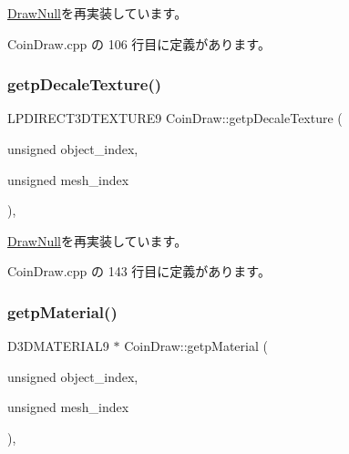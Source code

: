 \mbox{\hyperlink{class_draw_null_a7586cc78eed6bcaf2972ad7a6a70e665}{Draw\+Null}}を再実装しています。



 Coin\+Draw.\+cpp の 106 行目に定義があります。

\mbox{\label{class_coin_draw_af99db1c0db2ed6b3ba429f23cd44279b}} 
\subsubsection{\texorpdfstring{getp\+Decale\+Texture()}{getpDecaleTexture()}}
{\footnotesize\ttfamily L\+P\+D\+I\+R\+E\+C\+T3\+D\+T\+E\+X\+T\+U\+R\+E9 Coin\+Draw\+::getp\+Decale\+Texture (\begin{DoxyParamCaption}\item[{unsigned}]{object\+\_\+index,  }\item[{unsigned}]{mesh\+\_\+index }\end{DoxyParamCaption})\hspace{0.3cm}{\ttfamily [override]}, {\ttfamily [virtual]}}



\mbox{\hyperlink{class_draw_null_a2dfa2d2cbb66249f933420a38e9cadad}{Draw\+Null}}を再実装しています。



 Coin\+Draw.\+cpp の 143 行目に定義があります。

\mbox{\label{class_coin_draw_ad62dd6a9dd468342849a0c6ad5f8a5dd}} 
\subsubsection{\texorpdfstring{getp\+Material()}{getpMaterial()}}
{\footnotesize\ttfamily D3\+D\+M\+A\+T\+E\+R\+I\+A\+L9 $\ast$ Coin\+Draw\+::getp\+Material (\begin{DoxyParamCaption}\item[{unsigned}]{object\+\_\+index,  }\item[{unsigned}]{mesh\+\_\+index }\end{DoxyParamCaption})\hspace{0.3cm}{\ttfamily [override]}, {\ttfamily [virtual]}}



